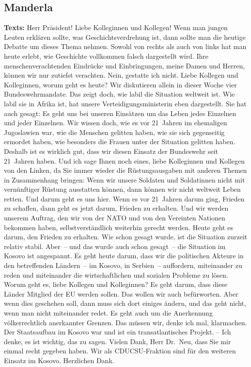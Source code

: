 \documentclass{article}
\begin{document}
\subsection{Manderla}
\noindent\textbf{Texts:} Herr Präsident! Liebe Kolleginnen und Kollegen! Wenn man jungen Leuten erklären sollte, was Geschichtsverdrehung ist, dann sollte man die heutige Debatte um dieses Thema nehmen. Sowohl von rechts als auch von links hat man heute erlebt,  wie Geschichte vollkommen falsch dargestellt wird.  Ihre menschenverachtenden Eindrücke und Einbringungen, meine Damen und Herren, können wir nur zutiefst verachten.  Nein, gestatte ich nicht.  Liebe Kollegen und Kolleginnen, worum geht es heute? Wir diskutieren allein in dieser Woche vier Bundeswehrmandate. Das zeigt doch, wie labil die Situation weltweit ist.  Wie labil sie in Afrika ist, hat unsere Verteidigungsministerin eben dargestellt. Sie hat auch gesagt: Es geht uns bei unseren Einsätzen um das Leben jedes Einzelnen und jeder Einzelnen. Wir wissen doch, wie es vor 21 Jahren im ehemaligen Jugoslawien war, wie die Menschen gelitten haben, wie sie sich gegenseitig ermordet haben, wie besonders die Frauen unter der Situation gelitten haben. Deshalb ist es wirklich gut, dass wir diesen Einsatz der Bundeswehr seit 21 Jahren haben. Und ich sage Ihnen noch eines, liebe Kolleginnen und Kollegen von den Linken, da Sie immer wieder die Rüstungsausgaben mit anderen Themen in Zusammenhang bringen: Wenn wir unsere Soldaten und Soldatinnen nicht mit vernünftiger Rüstung ausstatten können, dann können wir nicht weltweit Leben retten. Und darum geht es uns hier.  Wenn es vor 21 Jahren darum ging, Frieden zu schaffen, dann geht es jetzt darum, Frieden zu erhalten. Und wir werden unserem Auftrag, den wir von der NATO und von den Vereinten Nationen bekommen haben, selbstverständlich weiterhin gerecht werden. Heute geht es darum, den Frieden zu erhalten. Wie schon gesagt wurde, ist die Situation zurzeit relativ stabil. Aber – und das wurde auch schon gesagt – die Situation im Kosovo ist angespannt. Es geht heute darum, dass wir die politischen Akteure in den betreffenden Ländern – im Kosovo, in Serbien – auffordern, miteinander zu reden und miteinander die wirtschaftlichen und sozialen Probleme zu lösen. Worum geht es, liebe Kollegen und Kolleginnen? Es geht darum, dass diese Länder Mitglied der EU werden sollen. Das wollen wir auch befürworten. Aber wenn dies geschehen soll, dann muss sich dort einiges ändern, und das geht nicht, wenn man nicht miteinander redet. Es geht auch um die Anerkennung völkerrechtlich anerkannter Grenzen. Das müssen wir, denke ich mal, klarmachen. Der Staatsaufbau im Kosovo war und ist ein transatlantisches Projekt.  – Ich denke, es ist wichtig, das zu sagen. Vielen Dank, Herr Dr. Neu, dass Sie mir einmal recht gegeben haben.  Wir als CDU\/CSU-Fraktion sind für den weiteren Einsatz im Kosovo. Herzlichen Dank. 
\end{document}
